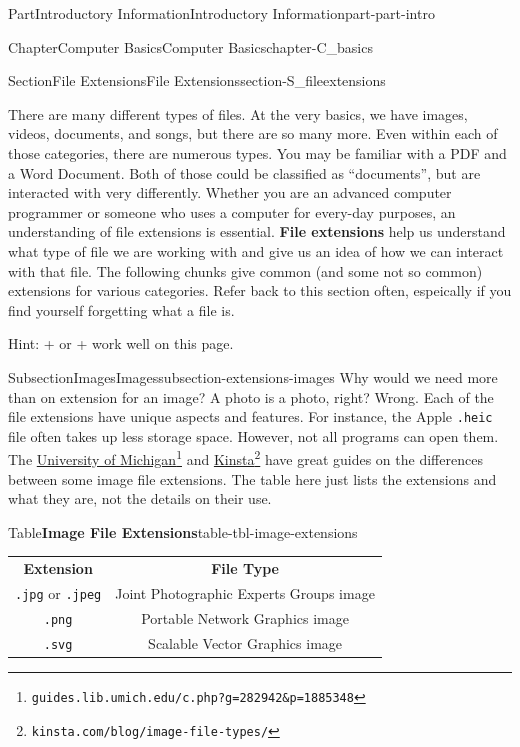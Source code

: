 \documentclass[oneside,10pt,]{book}
\newcommand{\tabularfont}{\relax}
\newcommand{\mono}[1]{\texttt{#1}}
\newcommand{\terminology}[1]{\textbf{#1}}
\newcommand{\kbd}[1]{\keys{{#1}}}
\begin{document}
\begin{partptx}{Part}{Introductory Information}{}{Introductory Information}{}{}{part-part-intro}
\begin{chapterptx}{Chapter}{Computer Basics}{}{Computer Basics}{}{}{chapter-C_basics}
\begin{sectionptx}{Section}{File Extensions}{}{File Extensions}{}{}{section-S_fileextensions}
\begin{introduction}{}
There are many different types of files. At the very basics, we have images, videos, documents, and songs, but there are so many more. Even within each of those categories, there are numerous types. You may be familiar with a PDF and a Word Document. Both of those could be classified as ``documents'', but are interacted with very differently. Whether you are an advanced computer programmer or someone who uses a computer for every-day purposes, an understanding of file extensions is essential. \terminology{File extensions} help us understand what type of file we are working with and give us an idea of how we can interact with that file. The following chunks give common (and some not so common) extensions for various categories. Refer back to this section often, espeically if you find yourself forgetting what a file is.%
\par
Hint: \kbd{Control} + \kbd{F} or \kbd{Command} + \kbd{F} work well on this page.%
\end{introduction}%
%
%
\typeout{************************************************}
\typeout{************************************************}
%
\begin{subsectionptx}{Subsection}{Images}{}{Images}{}{}{subsection-extensions-images}
%
Why would we need more than on extension for an image? A photo is a photo, right? Wrong. Each of the file extensions have unique aspects and features. For instance, the Apple \mono{.heic} file often takes up less storage space. However, not all programs can open them. The \href{https://guides.lib.umich.edu/c.php?g=282942\&p=1885348}{University of Michigan}\footnote{\nolinkurl{guides.lib.umich.edu/c.php?g=282942\&p=1885348}\label{fn-extensions-images-c-c}} and \href{https://kinsta.com/blog/image-file-types/}{Kinsta}\footnote{\nolinkurl{kinsta.com/blog/image-file-types/}\label{fn-extensions-images-c-e}} have great guides on the differences between some image file extensions. The table here just lists the extensions and what they are, not the details on their use.%
\begin{tableptx}{Table}{\textbf{Image File Extensions}}{table-tbl-image-extensions}{}%
\centering%
{\tabularfont%
\begin{tabular}{cc}
{\bfseries{}Extension}&{\bfseries{}File Type}\tabularnewline[0pt]
\mono{.jpg} or \mono{.jpeg}&Joint Photographic Experts Groups image\tabularnewline[0pt]
\mono{.png}&Portable Network Graphics image\tabularnewline[0pt]
\mono{.svg}&Scalable Vector Graphics image\tabularnewline[0pt]

\end{tabular}}
\end{tableptx}
\end{subsectionptx}
\end{sectionptx}
\end{chapterptx}
\end{partptx}
\end{document}
